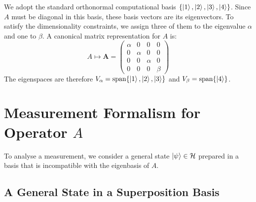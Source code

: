 \documentclass[11pt,a4paper]{article}
\begin{document}
We adopt the standard orthonormal computational basis $\{\ket{1}, \ket{2},
\ket{3}, \ket{4}\}$. Since $A$ must be diagonal in this basis, these basis
vectors are its eigenvectors. To satisfy the dimensionality constraints, we
assign three of them to the eigenvalue $\alpha$ and one to $\beta$. A canonical
matrix representation for $A$ is:
$$
A \mapsto \mathbf{A} =
\begin{pmatrix}
  \alpha & 0 & 0 & 0 \\
  0 & \alpha & 0 & 0 \\
  0 & 0 & \alpha & 0 \\
  0 & 0 & 0 & \beta
\end{pmatrix}
$$
The eigenspaces are therefore $V_\alpha = \text{span}\{\ket{1}, \ket{2},
\ket{3}\}$ and $V_\beta = \text{span}\{\ket{4}\}$.

\section{Measurement Formalism for Operator \texorpdfstring{$A$}{A}}

To analyse a measurement, we consider a general state $\ket{\psi} \in
\mathcal{H}$ prepared in a basis that is incompatible with the eigenbasis of
$A$.

\subsection{A General State in a Superposition Basis}
\end{document}
